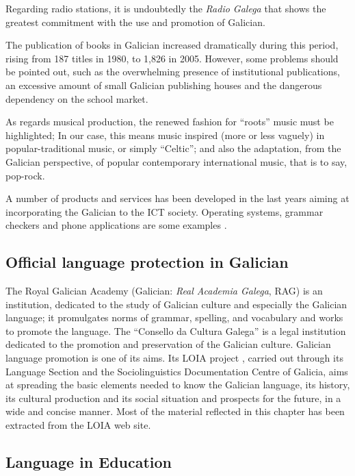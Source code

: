\begin{multicols}{2}
Regarding radio stations, it is undoubtedly the \textit{Radio Galega} that shows the greatest commitment with the use and promotion of Galician. 

The publication of books in Galician increased dramatically during this period, rising from 187 titles in 1980, to 1,826 in 2005. However, some problems should be pointed out, such as the overwhelming presence of institutional publications, an excessive amount of small Galician publishing houses and the dangerous dependency on the school market. 

As regards musical production, the renewed fashion for “roots” music must be highlighted; In our case, this means music inspired (more or less vaguely) in popular-traditional music, or simply “Celtic”; and also the adaptation, from the Galician perspective, of popular contemporary international music, that is to say, pop-rock.

A number of products and services has been developed in the last years aiming at incorporating the Galician to the ICT society. Operating systems, grammar checkers and phone applications are some examples \cite{GAL-Nota10}.

\subsection{Official language protection in Galician}

   The Royal Galician Academy \cite{GAL-Nota11} (Galician: \textit{Real Academia Galega}, RAG) is an institution, dedicated to the study of Galician culture and especially the Galician language; it promulgates norms of grammar, spelling, and vocabulary and works to promote the language. 
The “Consello da Cultura Galega” \cite{GAL-Nota6}  is a legal institution dedicated to the promotion and preservation of the Galician culture. Galician language promotion is one of its aims. Its LOIA project \cite{GAL-Nota7}, carried out through its Language Section and the Sociolinguistics Documentation Centre of Galicia, aims at spreading the basic elements needed to know the Galician language, its history, its cultural production and its social situation and prospects for the future, in a wide and concise manner. Most of the material reflected in this chapter has been extracted from the LOIA web site.

\subsection{Language in Education}


\end{multicols}
